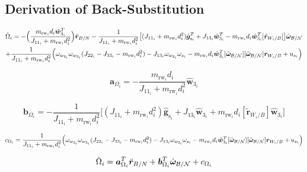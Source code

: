 \documentclass[]{BasiliskReportMemo}
\begin{document}
\subsection{Derivation of Back-Substitution}

\begin{multline}
\dot{\Omega}_i
= -\Big(\frac{m_{\text{rw}_i} d_i \hat{\bm{w}}_{3_i}^T}{J_{11_i} + m_{\text{rw}_i} d_i^2}\Big)\ddot{\bm{r}}_{B/N} 
- \frac{1}{J_{11_i} + m_{\text{rw}_i} d_i^2}\big[(J_{11_i} + m_{\text{rw}_i} d_i^2)\hat{\bm g}_{\text{s}_i}^T  + J_{13_i}\hat{\bm w}_{3_i}^T -m_{\text{rw}_i} d_i \hat{\bm{w}}_{3_i}^T [\tilde{\bm r}_{W_i/B}]\big]\dot{\bm\omega}_{\cal B/N}
\\
+\frac{1}{J_{11_i} + m_{\text{rw}_i} d_i^2}  \Big( 
\omega_{w_{2_i}} \omega_{w_{3_i}} (J_{22_i} - J_{33_i} - m_{\text{rw}_i} d_i^2
) - J_{13_i} \omega_{w_{2_i}}\omega_{s_i}  
-m_{\text{rw}_i} d_i \hat{\bm{w}}_{3_i}^T [\tilde{\bm\omega}_{\cal B/N}] [\tilde{\bm\omega}_{\cal B/N}] \bm r_{W_i/B} + u_{s_i} \Big)
\label{eq:motorTorqueFinal2}
\end{multline}

\begin{equation}
\bm{a}_{\Omega_i} = -\frac{m_{\text{rw}_i} d_i}{J_{11_i} + m_{\text{rw}_i} d_i^2}\hat{\bm{w}}_{3_i}
\end{equation}

\begin{equation}
\bm{b}_{\Omega_i} = - \frac{1}{J_{11_i} + m_{\text{rw}_i} d_i^2}\big[(J_{11_i} + m_{\text{rw}_i} d_i^2)\hat{\bm g}_{\text{s}_i}  + J_{13_i}\hat{\bm w}_{3_i} +m_{\text{rw}_i} d_i [\tilde{\bm r}_{W_i/B}]\hat{\bm{w}}_{3_i}\big]
\end{equation}

\begin{equation}
c_{\Omega_i} = \frac{1}{J_{11_i} + m_{\text{rw}_i} d_i^2}  \Big( 
\omega_{w_{2_i}} \omega_{w_{3_i}} (J_{22_i} - J_{33_i} - m_{\text{rw}_i} d_i^2
) - J_{13_i} \omega_{w_{2_i}}\omega_{s_i}  
-m_{\text{rw}_i} d_i \hat{\bm{w}}_{3_i}^T [\tilde{\bm\omega}_{\cal B/N}] [\tilde{\bm\omega}_{\cal B/N}] \bm r_{W_i/B} + u_{s_i} \Big)
\end{equation}

\begin{equation}
\dot{\Omega}_i = \bm{a}_{\Omega_i}^T\ddot{\bm r}_{B/N} + \bm{b}_{\Omega_i}^T\dot{\bm\omega}_{\cal B/N} + c_{\Omega_i}
\end{equation}
\end{document}
